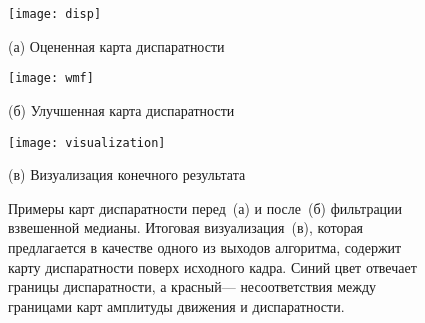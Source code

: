 \begin{figure}[t]
	\begin{minipage}[b]{0.49\linewidth}
		\centering
		\centerline{ \texttt{[image: disp]} }
		\centerline{(а) Оцененная карта диспаратности}\medskip
	\end{minipage}
	\hfill
	\begin{minipage}[b]{0.49\linewidth}
		\centering
		\centerline{\texttt{[image: wmf]} }
		\centerline{(б) Улучшенная карта диспаратности}\medskip
	\end{minipage}
	\begin{minipage}[b]{1\linewidth}
		\centering
		\centerline{\texttt{[image: visualization]} }
		\centerline{(в) Визуализация конечного результата}
	\end{minipage}
    \caption{Примеры карт диспаратности перед~(а) и после~(б) фильтрации 
    	взвешенной медианы. Итоговая визуализация~(в), которая предлагается
    	в качестве одного из выходов алгоритма, содержит карту диспаратности поверх 
    	исходного кадра. Синий цвет отвечает границы диспаратности, а красный---
    	несоответствия между границами карт  амплитуды движения и диспаратности.}
	\label{fig:disp}
\end{figure}
